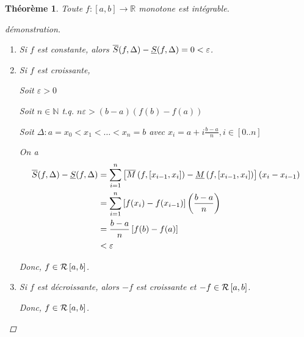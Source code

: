 \documentclass{report}
\newcommand*{\eps}{\varepsilon}
\newcommand*{\reels}{\mathbb{R}}
\newcommand*{\naturels}{\mathbb{N}}
\newtheorem*{thm}{Th\'eor\`eme}
\theoremstyle{definition}
\theoremstyle{remark}
\begin{document}
	\begin{thm}
		Toute $f:[a,b] \to \reels$ monotone est int\'egrable.
		\begin{proof}[d\'emonstration]~

			\begin{enumerate}[label=(\arabic*)]
				\item Si $f$ est constante, alors $\ssup{f}-\sinf{f}=0<\eps$.
				\item Si $f$ est croissante,

				Soit $\eps>0$

				Soit $n \in \naturels$ t.q. $n\eps>(b-a)(f(b)-f(a))$

				Soit $\Delta:a=x_0<x_1<\dotsc<x_n=b$ avec $x_i=a+i\frac{b-a}{n}, i\in[0..n]$

				On a
				\begin{align*}
					\ssup{f}-\sinf{f}&= \sum_{i=1}^{n}\left[ \msup{f}[x_{i-1},x_i] - \minf{f}[x_{i-1},x_i] \right] (x_i-x_{i-1})\\
					&= \sum_{i=1}^{n}\left[ f(x_i) - f(x_{i-1}) \right] \left( \frac{b-a}{n} \right)\\
					&= \frac{b-a}{n} \left[ f(b)-f(a) \right]\\
					&< \eps
				\end{align*}

				Donc, $f \in \riemann$.
				\item Si $f$ est d\'ecroissante, alors $-f$ est croissante et $-f \in \riemann$.

				Donc, $f \in \riemann$.
			\end{enumerate}
		\end{proof}
	\end{thm}
\end{document}

